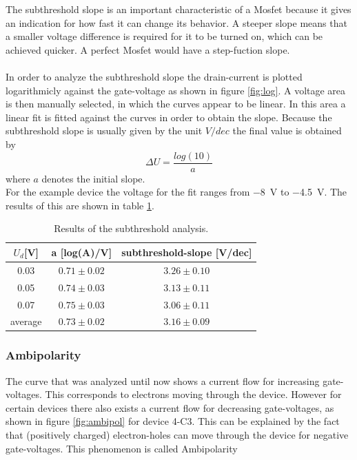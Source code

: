 \documentclass[%
 reprint,
amsmath,amssymb,
pra,
]{revtex4-1}
\begin{document}
The subthreshold slope is an important characteristic of a Mosfet because it gives an indication for how fast it can change its behavior. A steeper slope means that a smaller voltage difference is required for it to be turned on, which can be achieved quicker. A perfect Mosfet would have a step-fuction slope.\\
\\
In order to analyze the subthreshold slope the drain-current is plotted logarithmicly against the gate-voltage as shown in figure \ref{fig:log}. A voltage area is then manually  selected, in which the curves appear to be linear. In this area a linear fit is fitted against the curves in order to obtain the slope. Because the subthreshold slope is usually given by the unit $\si{V/dec}$ the final value is obtained by
\begin{equation}
\Delta U = \dfrac{log(10)}{a}
\end{equation}
where $a$ denotes the initial slope.\\
For the example device the voltage for the fit ranges from \SI{-8}{V} to \SI{-4.5}{V}. The results of this are shown in table \ref{tab:subthreshold_example}.

\begin{table}
\centering
\begin{tabular}{|c|c|c|}
\hline
$U_d$[\si{V}] & a [log(A)/V] & subthreshold-slope [V/dec] \\
\hline
0.03 & $0.71\pm 0.02$ & $3.26\pm 0.10$\\
\hline
0.05 & $0.74\pm 0.03$ & $3.13\pm 0.11$\\
\hline
0.07 & $0.75\pm 0.03$ & $3.06\pm 0.11$\\
\hline
average & $0.73\pm 0.02$ & $3.16\pm 0.09$\\
\hline
\end{tabular}
\label{tab:subthreshold_example}
\caption{Results of the subthreshold analysis.}
\end{table}

\subsubsection{Ambipolarity}
The curve that was analyzed until now shows a current flow for increasing gate-voltages. This corresponds to electrons moving through the device. However for certain devices there also exists a current flow for decreasing gate-voltages, as shown in figure \ref{fig:ambipol} for device 4-C3. This can be explained by the fact that (positively charged) electron-holes can move through the device for negative gate-voltages. This phenomenon is called Ambipolarity
\end{document}
